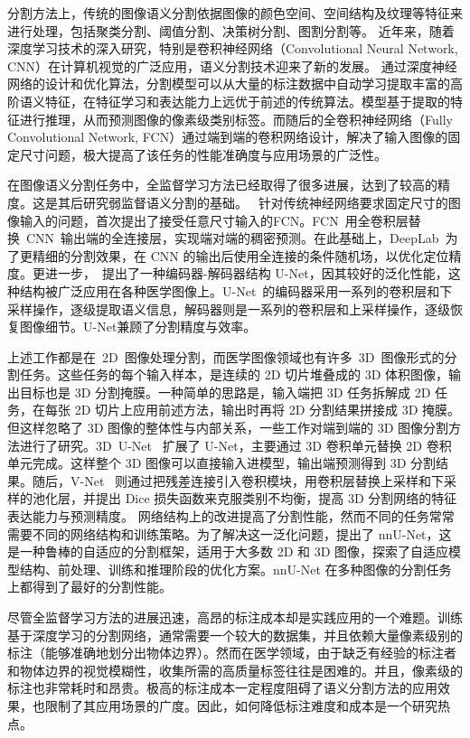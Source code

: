分割方法上，传统的图像语义分割依据图像的颜色空间、空间结构及纹理等特征来进行处理，包括聚类分割\citep{coates2012learning}、阈值分割\citep{ying2005fast}、决策树分割\citep{shotton2008semantic}、图割分割\citep{vicente2008graph}等。
近年来，随着深度学习技术的深入研究，特别是卷积神经网络（Convolutional Neural Network, CNN）在计算机视觉的广泛应用，语义分割技术迎来了新的发展。
通过深度神经网络的设计和优化算法，分割模型可以从大量的标注数据中自动学习提取丰富的高阶语义特征，在特征学习和表达能力上远优于前述的传统算法。模型基于提取的特征进行推理，从而预测图像的像素级类别标签。而随后的全卷积神经网络（Fully Convolutional Network, FCN）通过端到端的卷积网络设计，解决了输入图像的固定尺寸问题，极大提高了该任务的性能准确度与应用场景的广泛性。%

在图像语义分割任务中，全监督学习方法已经取得了很多进展，达到了较高的精度。这是其后研究弱监督语义分割的基础。
\citet{long2015fully}~针对传统神经网络要求固定尺寸的图像输入的问题，首次提出了接受任意尺寸输入的FCN。FCN~用全卷积层替换~CNN~输出端的全连接层，实现端对端的稠密预测。在此基础上，DeepLab~为了更精细的分割效果，在 CNN 的输出后使用全连接的条件随机场，以优化定位精度。更进一步，\citet{ronneberger2015u}~提出了一种编码器-解码器结构 U-Net，因其较好的泛化性能，这种结构被广泛应用在各种医学图像上。U-Net~的编码器采用一系列的卷积层和下采样操作，逐级提取语义信息，解码器则是一系列的卷积层和上采样操作，逐级恢复图像细节。U-Net兼顾了分割精度与效率。

上述工作都是在~2D~图像处理分割，而医学图像领域也有许多~3D~图像形式的分割任务。这些任务的每个输入样本，是连续的 2D 切片堆叠成的 3D 体积图像，输出目标也是 3D 分割掩膜。一种简单的思路是，输入端把 3D 任务拆解成 2D 任务，在每张 2D 切片上应用前述方法，输出时再将 2D 分割结果拼接成 3D 掩膜。但这样忽略了 3D 图像的整体性与内部关系，一些工作对端到端的 3D 图像分割方法进行了研究。3D~U-Net~\citep{cciccek20163d} 扩展了 U-Net，主要通过 3D 卷积单元替换 2D 卷积单元完成。这样整个 3D 图像可以直接输入进模型，输出端预测得到 3D 分割结果。随后，V-Net~\citep{milletari2016v} 则通过把残差连接引入卷积模块，用卷积层替换上采样和下采样的池化层，并提出 Dice 损失函数来克服类别不均衡，提高 3D 分割网络的特征表达能力与预测精度。
网络结构上的改进提高了分割性能，然而不同的任务常常需要不同的网络结构和训练策略。为了解决这一泛化问题，\citet{isensee2019automated}提出了 nnU-Net，这是一种鲁棒的自适应的分割框架，适用于大多数 2D 和 3D 图像，探索了自适应模型结构、前处理、训练和推理阶段的优化方案。nnU-Net 在多种图像的分割任务上都得到了最好的分割性能。

尽管全监督学习方法的进展迅速，高昂的标注成本却是实践应用的一个难题。训练基于深度学习的分割网络，通常需要一个较大的数据集，并且依赖大量像素级别的标注（能够准确地划分出物体边界）。然而在医学领域，由于缺乏有经验的标注者和物体边界的视觉模糊性，收集所需的高质量标签往往是困难的。并且，像素级的标注也非常耗时和昂贵。极高的标注成本一定程度阻碍了语义分割方法的应用效果，也限制了其应用场景的广度。因此，如何降低标注难度和成本是一个研究热点。

